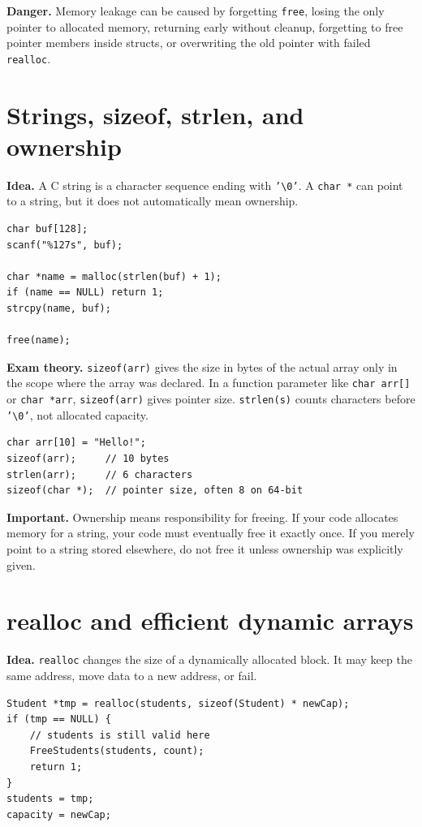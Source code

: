 \documentclass[10pt,a4paper]{article}
\newcommand{\idea}{\noindent\textbf{\textcolor{accentdark}{Idea.}} }
\newcommand{\theory}{\noindent\textbf{\textcolor{accentdark}{Exam theory.}} }
\newcommand{\important}[1]{\par\smallskip\noindent\colorbox{softyellow}{\parbox{\dimexpr\linewidth-2\fboxsep}{\textbf{\textcolor{accentdark}{Important.}} #1}}\par\smallskip}
\newcommand{\danger}[1]{\par\smallskip\noindent\colorbox{softred}{\parbox{\dimexpr\linewidth-2\fboxsep}{\textbf{Danger.} #1}}\par\smallskip}
\begin{document}
\danger{Memory leakage can be caused by forgetting \texttt{free}, losing the only pointer to allocated memory, returning early without cleanup, forgetting to free pointer members inside structs, or overwriting the old pointer with failed \texttt{realloc}.}

\section{Strings, sizeof, strlen, and ownership}
\idea A C string is a character sequence ending with \texttt{'\textbackslash0'}. A \texttt{char *} can point to a string, but it does not automatically mean ownership.

\begin{lstlisting}[caption={Allocate exact memory for a string}]
char buf[128];
scanf("%127s", buf);

char *name = malloc(strlen(buf) + 1);
if (name == NULL) return 1;
strcpy(name, buf);

free(name);
\end{lstlisting}

\theory \texttt{sizeof(arr)} gives the size in bytes of the actual array only in the scope where the array was declared. In a function parameter like \texttt{char arr[]} or \texttt{char *arr}, \texttt{sizeof(arr)} gives pointer size. \texttt{strlen(s)} counts characters before \texttt{'\textbackslash0'}, not allocated capacity.

\begin{lstlisting}[caption={sizeof versus strlen}]
char arr[10] = "Hello!";
sizeof(arr);     // 10 bytes
strlen(arr);     // 6 characters
sizeof(char *);  // pointer size, often 8 on 64-bit
\end{lstlisting}

\important{Ownership means responsibility for freeing. If your code allocates memory for a string, your code must eventually free it exactly once. If you merely point to a string stored elsewhere, do not free it unless ownership was explicitly given.}

\section{realloc and efficient dynamic arrays}
\idea \texttt{realloc} changes the size of a dynamically allocated block. It may keep the same address, move data to a new address, or fail.

\begin{lstlisting}[caption={Correct realloc pattern}]
Student *tmp = realloc(students, sizeof(Student) * newCap);
if (tmp == NULL) {
    // students is still valid here
    FreeStudents(students, count);
    return 1;
}
students = tmp;
capacity = newCap;
\end{lstlisting}
\end{document}
